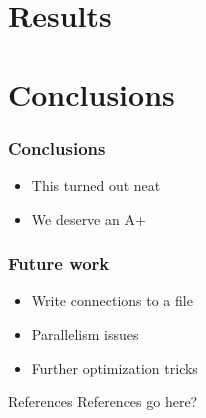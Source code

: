 \documentclass{beamer}
\begin{document}
\section{Results}
\section{Conclusions}

\begin{frame}
  \frametitle{Conclusions}
  \begin{itemize}
	 \item This turned out neat
	 \item We deserve an A+
  \end{itemize}
\end{frame}

\begin{frame}
  \frametitle{Future work}
  \begin{itemize}
	 \item Write connections to a file
	 \item Parallelism issues
   \item Further optimization tricks
  \end{itemize}
\end{frame}

\appendix
\begin{frame}{References}
  References go here?
\end{frame}
\end{document}
